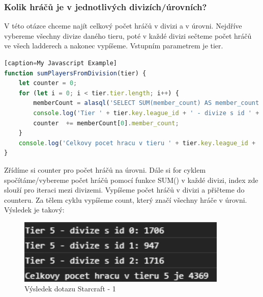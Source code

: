 \documentclass[a4, titlepage]{article}
\begin{document}
\subsubsection{Kolik hráčů je v jednotlivých divizích/úrovních?}
V této otázce chceme najít celkový počet hráčů v divizi a v úrovni. Nejdříve vybereme všechny divize daného tieru, poté v každé divizi sečteme počet hráčů ve všech ladderech a nakonec vypíšeme. Vstupním parametrem je tier.
\begin{lstlisting}[language=JavaScript][caption=My Javascript Example]
function sumPlayersFromDivision(tier) {
    let counter = 0;
    for (let i = 0; i < tier.tier.length; i++) {
        memberCount = alasql('SELECT SUM(member_count) AS member_count FROM ?', [tier.tier[i].division]);
        console.log('Tier ' + tier.key.league_id + ' - divize s id ' + tier.tier[i].id + ': ' + memberCount[0].member_count);
        counter  += memberCount[0].member_count;
    }
    console.log('Celkovy pocet hracu v tieru ' + tier.key.league_id + ' je ' + counter);
}
\end{lstlisting}
Zřídíme si counter pro počet hráčů na úrovni. Dále si for cyklem spočítáme/vybereme počet hráčů pomocí funkce SUM() v každé divizi, index zde slouží pro iteraci mezi divizemi. Vypíšeme počet hráčů v divizi a přičteme do counteru. Za tělem cyklu vypíšeme count, který značí všechny hráče v úrovni. Výsledek je takový: 
\begin{figure}[h]
    \centering
    \includegraphics[width=10cm]{S1}
    \caption{Výsledek dotazu Starcraft - 1}
\end{figure}
\end{document}
